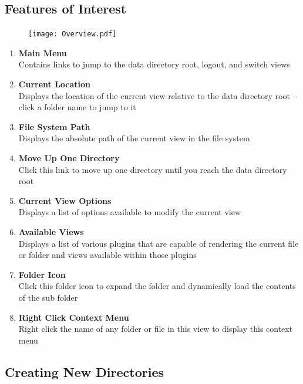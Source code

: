 \documentclass[10pt]{article}
\begin{document}
\subsection{Features of Interest}
\begin{figure}[h!]
	\centering
	\texttt{[image: Overview.pdf]}
\end{figure}
\begin{multicols}{2}
\begin{enumerate}
    \item \textbf{Main Menu} \\
          Contains links to jump to the data directory root, logout, and switch views
    \item \textbf{Current Location} \\
          Displays the location of the current view relative to the data directory root -- click a folder name to jump to it
    \item \textbf{File System Path} \\
          Displays the absolute path of the current view in the file system
    \item \textbf{Move Up One Directory} \\
          Click this link to move up one directory until you reach the data directory root
    \item \textbf{Current View Options} \\
          Displays a list of options available to modify the current view
    \item \textbf{Available Views} \\
          Displays a list of various plugins that are capable of rendering the current file or folder and views available within those plugins
    \item \textbf{Folder Icon} \\
          Click this folder icon to expand the folder and dynamically load the contents of the sub folder
    \item \textbf{Right Click Context Menu} \\
          Right click the name of any folder or file in this view to display this context menu
\end{enumerate}
\end{multicols}

\clearpage
\subsection{Creating New Directories}
\end{document}
